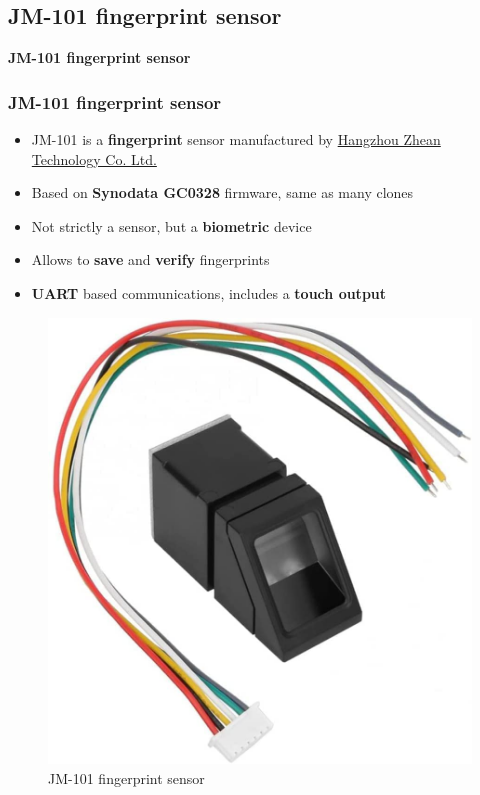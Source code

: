 \documentclass[handout]{beamer}
\begin{document}
\subsection{JM-101 fingerprint sensor}

\begin{frame}
  \begin{center}
    \Large \textbf{JM-101 fingerprint sensor}
  \end{center}
\end{frame}

\begin{frame}
  \frametitle{JM-101 fingerprint sensor}

  \begin{itemize}
    \item JM-101 is a \textbf{fingerprint} sensor manufactured by
          \href{www.zeantec.com}{Hangzhou Zhean Technology Co. Ltd.}
    \item Based on \textbf{Synodata GC0328} firmware, same as many clones
    \item Not strictly a sensor, but a \textbf{biometric} device
    \item Allows to \textbf{save} and \textbf{verify} fingerprints
    \item \textbf{UART} based communications, includes a \textbf{touch output}
  \end{itemize}

  \begin{figure}
    \centering
    \includegraphics[scale=0.1]{fingerprint-sensor.jpg}
    \caption{JM-101 fingerprint sensor}
  \end{figure}
\end{frame}
\end{document}
